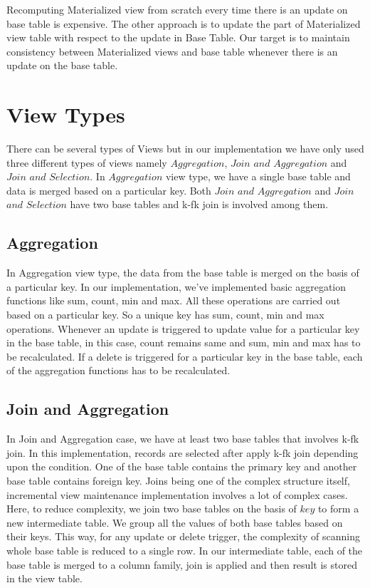\documentclass[11pt,a4paper,bibtotoc,idxtotoc,headsepline,footsepline,footexclude,BCOR12mm,DIV13]{scrbook}
\begin{document}
Recomputing Materialized view from scratch every time there is an update on base table is expensive. The other approach is to update the part of Materialized view table with respect to the update in Base Table. Our target is to maintain consistency between Materialized views and base table whenever there is an update on the base table.

\section{View Types}
\label{View Types}
There can be several types of Views but in our implementation we have only used three different types of views namely $Aggregation$, $Join$ $and$ $Aggregation$ and $Join$ $and$ $Selection$. In $Aggregation$ view type, we have a single base table and data is merged based on a particular key. Both  $Join$ $and$ $Aggregation$ and $Join$ $and$ $Selection$ have two base tables and k-fk join is involved among them. 

\subsection{Aggregation}
In Aggregation view type, the data from the base table is merged on the basis of a particular key. In our implementation, we've implemented basic aggregation functions like sum, count, min and max. All these operations are carried out based on a particular key. So a unique key has sum, count, min and max operations. Whenever an update is triggered to update value for a particular key in the base table, in this case, count remains same and sum, min and max has to be recalculated. If a delete is triggered for a particular key in the base table, each of the aggregation functions has to be recalculated. 


\subsection{Join and Aggregation}
In Join and Aggregation case, we have at least two base tables that involves k-fk join. In this implementation, records are selected after apply k-fk join depending upon the condition. One of the base table contains the primary key and another base table contains foreign key. Joins being one of the complex structure itself, incremental view maintenance implementation involves a lot of complex cases. Here, to reduce complexity, we join two base tables on the basis of $key$ to form a new intermediate table. We group all the values of both base tables based on their keys. This way, for any update or delete trigger, the complexity of scanning whole base table is reduced to a single row. In our intermediate table, each of the base table is merged to a column family, join is applied and then result is stored in the view table. 
\end{document}
